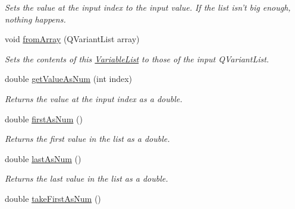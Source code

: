 \begin{DoxyCompactItemize}
\begin{DoxyCompactList}\small\item\em Sets the value at the input index to the input value. If the list isn't big enough, nothing happens. \end{DoxyCompactList}\item 
void \hyperlink{class_picto_1_1_variable_list_a1115980b91d026e2af9b4ff349ad9809}{from\-Array} (Q\-Variant\-List array)
\begin{DoxyCompactList}\small\item\em Sets the contents of this \hyperlink{class_picto_1_1_variable_list}{Variable\-List} to those of the input Q\-Variant\-List. \end{DoxyCompactList}\item 
\hypertarget{class_picto_1_1_variable_list_a2d1fd7ad747c0bd239c29b1af70e9060}{double \hyperlink{class_picto_1_1_variable_list_a2d1fd7ad747c0bd239c29b1af70e9060}{get\-Value\-As\-Num} (int index)}\label{class_picto_1_1_variable_list_a2d1fd7ad747c0bd239c29b1af70e9060}

\begin{DoxyCompactList}\small\item\em Returns the value at the input index as a double. \end{DoxyCompactList}\item 
\hypertarget{class_picto_1_1_variable_list_ac36e1da870406bde4fd351ceafc658be}{double \hyperlink{class_picto_1_1_variable_list_ac36e1da870406bde4fd351ceafc658be}{first\-As\-Num} ()}\label{class_picto_1_1_variable_list_ac36e1da870406bde4fd351ceafc658be}

\begin{DoxyCompactList}\small\item\em Returns the first value in the list as a double. \end{DoxyCompactList}\item 
\hypertarget{class_picto_1_1_variable_list_a5597f41e1e1d3dfe659748c366b1682b}{double \hyperlink{class_picto_1_1_variable_list_a5597f41e1e1d3dfe659748c366b1682b}{last\-As\-Num} ()}\label{class_picto_1_1_variable_list_a5597f41e1e1d3dfe659748c366b1682b}

\begin{DoxyCompactList}\small\item\em Returns the last value in the list as a double. \end{DoxyCompactList}\item 
\hypertarget{class_picto_1_1_variable_list_aeee8999226697a13b3df8f8f91d21fd0}{double \hyperlink{class_picto_1_1_variable_list_aeee8999226697a13b3df8f8f91d21fd0}{take\-First\-As\-Num} ()}\label{class_picto_1_1_variable_list_aeee8999226697a13b3df8f8f91d21fd0}


\end{DoxyCompactItemize}

